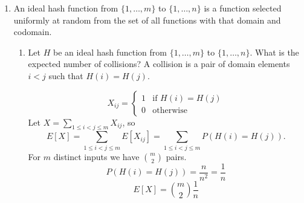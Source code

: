 \documentclass{article}
\begin{document}
\begin{enumerate}
\begin{enumerate}
        \item What is the expected number of coin flips until you get HHH?

        First find the probability of the 4 cases:
        \[
        P(T) = \frac{1}{2}, \qquad P(HT) = \frac{1}{4}, \qquad P(HHT) = \frac{1}{8}, \qquad P(HHH) = \frac{1}{8}.
        \]
        Now find each conditional expected value:
        \begin{itemize}
            \item $E[X \mid T] = 1 + E[X]$: 1 flip, start over.
            \item $E[X \mid HT] = 2 + E[X]$: 2 flips and start over.
            \item $E[X \mid HHT] = 3 + E[X]$: 3 flips, start over.
            \item $E[X \mid HHH] = 3$: goal achieved after 3 flips.
        \end{itemize}
        \[
        E[X] = \frac{1}{2}(1 + E[X]) + \frac{1}{4}(2 + E[X]) + \frac{1}{8}(3 + E[X]) + \frac{1}{8}(3)
        \]
        \[
        E[X] = \frac{7}{4} + \frac{7}{8}E[X]
        \]
        \[
        \frac{1}{8}E[X] = \frac{7}{4}
        \]
        \[
        \boxed{E[X] = 14}
        \]
    \end{enumerate}

    \item An ideal hash function from $\{1, \ldots, m\}$ to $\{1, \ldots, n\}$ is a function selected uniformly at random from the set of all functions with that domain and codomain.

    \begin{enumerate}
        \item Let $H$ be an ideal hash function from $\{1, \ldots, m\}$ to $\{1, \ldots, n\}$. What is the expected number of collisions? A collision is a pair of domain elements $i < j$ such that $H(i) = H(j)$.

        \[
        X_{ij} =
        \begin{cases}
        1 & \text{if } H(i) = H(j) \\
        0 & \text{otherwise}
        \end{cases}
        \]
        Let $X = \sum_{1 \le i < j \le m} X_{ij}$, so
        \[
        E[X] = \sum_{1 \le i < j \le m} E[X_{ij}] = \sum_{1 \le i < j \le m} P(H(i) = H(j)).
        \]
        For $m$ distinct inputs we have $\binom{m}{2}$ pairs.
        \[
        P(H(i) = H(j)) = \frac{n}{n^2} = \frac{1}{n}
        \]
        \[
        \boxed{E[X] = \binom{m}{2}\frac{1}{n}}
        \]


\end{enumerate}
\end{enumerate}
\end{document}
